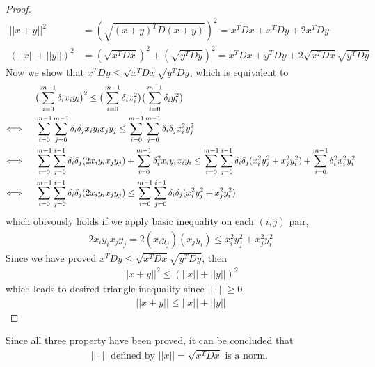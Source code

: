 \documentclass[11pt,a4paper]{article}
\begin{document}
\begin{proof}
    \begin{align}
        || x + y ||^2 &= (\sqrt{(x+y)^T D (x+y)})^2 
        = x^T D x + x^T D y + 2x^T D y  \\
        (|| x || + || y ||)^2 &= (\sqrt{x^T D x})^2 + (\sqrt{y^T D y})^2
        = x^T D x + y^T D y + 2\sqrt{x^T D x}\sqrt{y^T D y} 
    \end{align}
    Now we show that $ x^T D y \leq \sqrt{x^T D x}\sqrt{y^T D y}$, which is
    equivalent to
    \begin{align}
        & \big( \sum_{i=0}^{m-1} \delta_i x_i y_i \big)^2 \leq 
        \big(\sum_{i=0}^{m-1} \delta_i x_i^2 \big) \big( \sum_{i=0}^{m-1}
        \delta_i y_i^2 \big) \\
        \Longleftrightarrow \hspace{0.5cm}
        &  \sum_{i=0}^{m-1} \sum_{j=0}^{m-1} \delta_i \delta_j x_i y_i x_j y_j \leq
        \sum_{i=0}^{m-1} \sum_{j=0}^{m-1} \delta_i \delta_j x_i^2 y_j^2  \\
        \Longleftrightarrow \hspace{0.5cm}
        &  \sum_{i=0}^{m-1} \sum_{j=0}^{i-1} \delta_i \delta_j ( 2 x_i y_i x_j y_j)
        + \sum_{i=0}^{m-1} \delta_i^2 x_i y_i x_i y_i
        \leq
        \sum_{i=0}^{m-1} \sum_{j=0}^{i-1} \delta_i \delta_j (x_i^2 y_j^2 + x_j^2 y_i^2)
        + \sum_{i=0}^{m-1} \delta_i^2 x_i^2 y_i^2 \\
        \Longleftrightarrow \hspace{0.5cm}
        &  \sum_{i=0}^{m-1} \sum_{j=0}^{i-1} \delta_i \delta_j ( 2 x_i y_i x_j y_j)
        \leq
        \sum_{i=0}^{m-1} \sum_{j=0}^{i-1} \delta_i \delta_j (x_i^2 y_j^2 + x_j^2 y_i^2)
    \end{align}
    which obivously holds if we apply basic inequality on each $(i,j)$ pair, 
    \begin{align}
        2 x_i y_i x_j y_j = 2 (x_i y_j) (x_j y_i) \leq x_i^2 y_j^2 + x_j^2 y_i^2
    \end{align}
    Since we have proved $ x^T D y \leq \sqrt{x^T D x}\sqrt{y^T D y}$, then
    \begin{align}
        || x + y ||^2 \leq (|| x || + || y ||)^2
    \end{align}
    which leads to desired triangle inequality since $|| \cdot || \geq 0$,
    \begin{align}
        || x + y || \leq || x || + || y ||
    \end{align}
\end{proof}
Since all three property have been proved, it can be concluded that 
\begin{align}
    || \cdot || \text{ defined by $|| x || = \sqrt{x^T D x} $ is a norm. }
\end{align}
\end{document}
